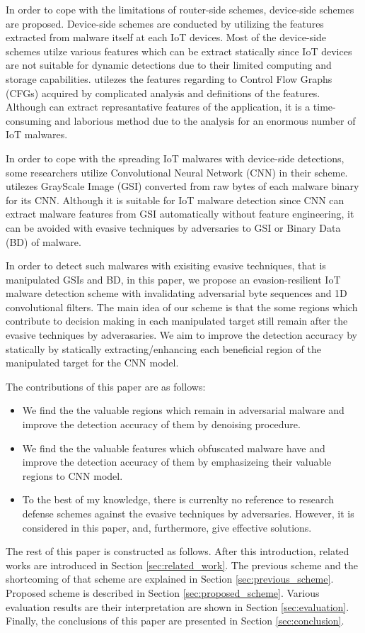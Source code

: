 In order to cope with the limitations of router-side schemes, device-side schemes are proposed.
Device-side schemes are conducted by utilizing the features extracted from malware itself at each IoT devices.
Most of the device-side schemes utilze various features which can be extract statically since IoT devices are not suitable for dynamic detections due to their limited computing and storage capabilities.
\cite{cfg} utilezes the features regarding to Control Flow Graphs (CFGs) acquired by complicated analysis and definitions of the features.
Although \cite{cfg} can extract represantative features of the application, it is a time-consuming and laborious method due to the analysis for an enormous number of IoT malwares.

In order to cope with the spreading IoT malwares with device-side detections, some researchers utilize Convolutional Neural Network (CNN) in their scheme.
\cite{previous} utilezes GrayScale Image (GSI) converted from raw bytes of each malware binary for its CNN.
Although it is suitable for IoT malware detection since CNN can extract malware features from GSI automatically without feature engineering, it can be avoided with evasive techniques by adversaries to GSI or Binary Data (BD) of malware. 

In order to detect such malwares with exisiting evasive techniques, that is manipulated GSIs and BD, in this paper, we propose an evasion-resilient IoT malware detection scheme with invalidating adversarial byte sequences and 1D convolutional filters.
The main idea of our scheme is that the some regions which contribute to decision making in each manipulated target still remain after the evasive techniques by adverasaries. 
We aim to improve the detection accuracy by statically by statically extracting/enhancing each beneficial region of the manipulated target for the CNN model.

The contributions of this paper are as follows: 
\begin{itemize}
 \item We find the the valuable regions which remain in adversarial malware and improve the detection accuracy of them by denoising procedure.
 \item We find the the valuable features which obfuscated malware have and improve the detection accuracy of them by emphasizeing their valuable regions to CNN model.
 \item To the best of my knowledge, there is currenlty no reference to research defense schemes against the evasive techniques by adversaries. However, it is considered in this paper, and, furthermore, give effective solutions.
\end{itemize}

The rest of this paper is constructed as follows. 
After this introduction, related works are introduced in Section \ref{sec:related_work}.
The previous scheme and the shortcoming of that scheme are explained in Section \ref{sec:previous_scheme}.
Proposed scheme is described in Section \ref{sec:proposed_scheme}.
Various evaluation results are their interpretation are shown in Section \ref{sec:evaluation}.
Finally, the conclusions of this paper are presented in Section \ref{sec:conclusion}.

